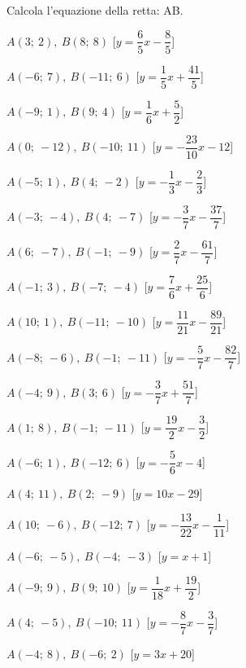 \subsubsection*{}

\begin{esercizio}\label{ese:}
 Calcola l'equazione della retta: AB.
\begin{multicols}{2}
 \begin{enumeratea}
  \item  $A(3;~2),~B(8;~8)$ \hfill 
   [$y = \dfrac{6}{5} x -\dfrac{8}{5}$]
  \item  $A(-6;~7),~B(-11;~6)$ \hfill 
   [$y = \dfrac{1}{5} x +\dfrac{41}{5}$]
  \item  $A(-9;~1),~B(9;~4)$ \hfill 
   [$y = \dfrac{1}{6} x +\dfrac{5}{2}$]
  \item  $A(0;~-12),~B(-10;~11)$ \hfill 
   [$y = -\dfrac{23}{10} x -12$]
  \item  $A(-5;~1),~B(4;~-2)$ \hfill 
   [$y = -\dfrac{1}{3} x -\dfrac{2}{3}$]
  \item  $A(-3;~-4),~B(4;~-7)$ \hfill 
   [$y = -\dfrac{3}{7} x -\dfrac{37}{7}$]
  \item  $A(6;~-7),~B(-1;~-9)$ \hfill 
   [$y = \dfrac{2}{7} x -\dfrac{61}{7}$]
  \item  $A(-1;~3),~B(-7;~-4)$ \hfill 
   [$y = \dfrac{7}{6} x +\dfrac{25}{6}$]
  \item  $A(10;~1),~B(-11;~-10)$ \hfill 
   [$y = \dfrac{11}{21} x -\dfrac{89}{21}$]
  \item  $A(-8;~-6),~B(-1;~-11)$ \hfill 
   [$y = -\dfrac{5}{7} x -\dfrac{82}{7}$]
  \item  $A(-4;~9),~B(3;~6)$ \hfill 
   [$y = -\dfrac{3}{7} x +\dfrac{51}{7}$]
  \item  $A(1;~8),~B(-1;~-11)$ \hfill 
   [$y = \dfrac{19}{2} x -\dfrac{3}{2}$]
  \item  $A(-6;~1),~B(-12;~6)$ \hfill 
   [$y = -\dfrac{5}{6} x -4$]
  \item  $A(4;~11),~B(2;~-9)$ \hfill 
   [$y = 10 x -29$]
  \item  $A(10;~-6),~B(-12;~7)$ \hfill 
   [$y = -\dfrac{13}{22} x -\dfrac{1}{11}$]
  \item  $A(-6;~-5),~B(-4;~-3)$ \hfill 
   [$y = x +1$]
  \item  $A(-9;~9),~B(9;~10)$ \hfill 
   [$y = \dfrac{1}{18} x +\dfrac{19}{2}$]
  \item  $A(4;~-5),~B(-10;~11)$ \hfill 
   [$y = -\dfrac{8}{7} x -\dfrac{3}{7}$]
  \item  $A(-4;~8),~B(-6;~2)$ \hfill 
   [$y = 3 x +20$]
 \end{enumeratea}
\end{multicols}
\end{esercizio}

